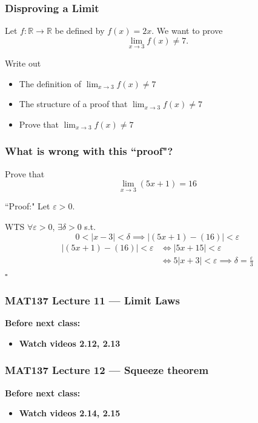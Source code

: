 \documentclass[14pt]{beamer}
\newcommand {\DS} [1] {${\displaystyle #1}$}
\newcommand{\e}{\varepsilon}
\newcommand{\p}{\pause}
\newcommand{\setsize}[1]{\fontsize{#1}{#1}\selectfont} %
\newcommand{\smallerfont}{\setsize{13}} %
\begin{document}
\begin{frame}
\frametitle{Disproving a Limit}

	Let $f:\mathbb R\to\mathbb R$ be defined by $f(x)=2x$. We want to prove
	\[
		\lim_{x\to 3} f(x)\neq 7.
	\]

	\vfill
	Write out
	\begin{itemize}
		\item The definition of \DS{\lim_{x\to 3}f(x)\neq 7}
		\item The structure of a proof that \DS{\lim_{x\to 3}f(x)\neq 7}
		\vfill\p
		\item Prove that \DS{\lim_{x\to 3}f(x)\neq 7}
	\end{itemize}

\end{frame}


\begin{frame}
\frametitle{What is wrong with this ``proof"?}
\smallerfont
\vspace{-2mm}
\begin{block}{}%
Prove that 
$$
\lim_{x\to 3} (5x+1) = 16
$$
\end{block}

\begin{block}{``Proof:"}
	Let $\e>0$.

	WTS $\forall \e>0$, $\exists\delta>0$ s.t. 
		$$  0<|x-3|<\delta \implies |(5x+1) - (16)|<\e$$
\vspace{-3mm}
	\begin{align*}
		|(5x+1) - (16)|<\varepsilon &\iff |5x+15|<\e \\
		&\iff 5|x+3|<\e \implies\delta=\frac{\e}{3}
	\end{align*}
\hfill $\square$
\end{block}

\end{frame}


\begin{frame}
\frametitle{MAT137 Lecture 11 --- Limit Laws}
	{\bf Before next class:}
		\begin{itemize} \normalsize
			\item {\bf Watch videos 2.12, 2.13 }
		\end{itemize}
	\vfill

\end{frame}



\begin{frame}
\frametitle{MAT137 Lecture 12 --- Squeeze theorem}
	{\bf Before next class:}
		\begin{itemize} \normalsize
			\item {\bf Watch videos 2.14, 2.15 }
		\end{itemize}
	\vfill

\end{frame}
\end{document}
